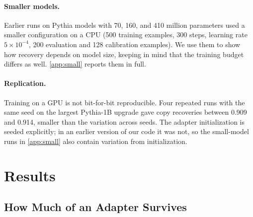 \documentclass[preprint,12pt,authoryear]{elsarticle}
\begin{document}
\paragraph{Smaller models.} Earlier runs on Pythia models with 70, 160, and 410 million parameters used a smaller configuration on a CPU (500 training examples, 300 steps, learning rate $5\times10^{-4}$, 200 evaluation and 128 calibration examples). We use them to show how recovery depends on model size, keeping in mind that the training budget differs as well. \ref{app:small} reports them in full.

\paragraph{Replication.} Training on a GPU is not bit-for-bit reproducible. Four repeated runs with the same seed on the largest Pythia-1B upgrade gave copy recoveries between 0.909 and 0.914, smaller than the variation across seeds. The adapter initialization is seeded explicitly; in an earlier version of our code it was not, so the small-model runs in \ref{app:small} also contain variation from initialization.

\section{Results}\label{sec:results}

\subsection{How Much of an Adapter Survives}\label{sec:survival}
\end{document}
